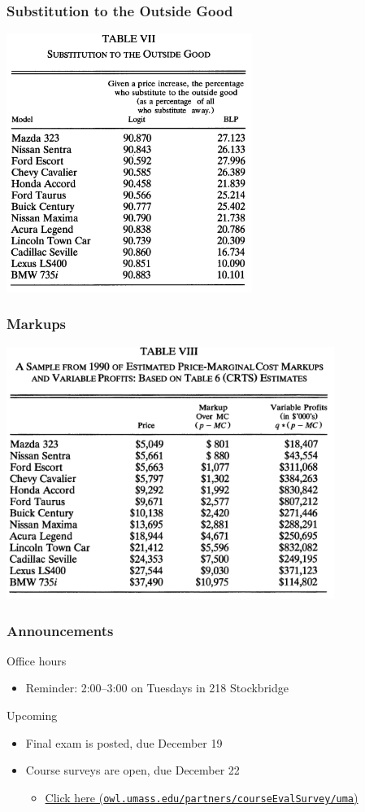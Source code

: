 \documentclass{beamer}
\begin{document}
\begin{frame}\frametitle{Substitution to the Outside Good}
    \centering
    \includegraphics[width=0.6\textwidth]{outside_good.png}
\end{frame}

\begin{frame}\frametitle{Markups}
    \centering
    \includegraphics[width=0.8\textwidth]{markups.png}
\end{frame}

\begin{frame}\frametitle{Announcements}
    Office hours
    \begin{itemize}
        \item Reminder: 2:00--3:00 on Tuesdays in 218 Stockbridge
    \end{itemize}
    \vspace{3ex}
    Upcoming
    \begin{itemize}
        \item Final exam is posted, due December 19
        \item Course surveys are open, due December 22
        \begin{itemize}
            \item \href{http://owl.umass.edu/partners/courseEvalSurvey/uma/}{Click here (\texttt{owl.umass.edu/partners/courseEvalSurvey/uma})}
        \end{itemize}
    \end{itemize}
\end{frame}
\end{document}
